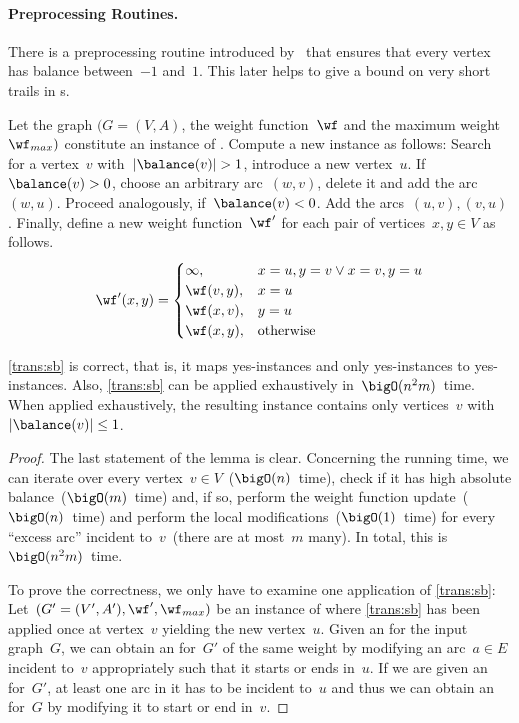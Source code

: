 \paragraph{Preprocessing Routines.}
There is a preprocessing routine introduced by~\citet{DMNW10} that ensures that every vertex has balance between~$-1$ and~$1$. This later helps to give a bound on very short trails in \EE s.
\begin{transformation}
  \label{trans:sb}
  Let the graph $(G=(V,A)$, the weight function~$\wf$ and the maximum weight~$\wf_{max})$ constitute an instance of \pWMEEs{}. Compute a new instance as follows: Search for a vertex~$v$ with~$|\balance(v)| > 1$, introduce a new vertex~$u$. If~$\balance(v) > 0$, choose an arbitrary arc~$(w, v)$, delete it and add the arc~$(w, u)$. Proceed analogously, if~$\balance(v) < 0$. Add the arcs~$(u, v), (v, u)$. Finally, define a new weight function~$\wf'$ for each pair of vertices~$x, y \in V$ as follows.
\[\wf'(x, y) = 
\begin{cases}
  \infty, & x = u, y = v \vee x = v, y = u \\
  \wf(v, y), & x = u \\
  \wf(x, v), & y = u \\
  \wf(x, y), & \text{otherwise}
\end{cases}
\]
\end{transformation}
\begin{lemma}
  \label{lem:smallbalancepp}
  \autoref{trans:sb} is correct, that is, it maps yes-instances and only yes-instances to yes-instances. Also, \autoref{trans:sb} can be applied exhaustively in~$\bigO(n^2m)$~time. When applied exhaustively, the resulting instance contains only vertices~$v$ with~$|\balance(v)| \leq 1$.
\end{lemma}
\begin{proof}
  The last statement of the lemma is clear. Concerning the running time, we can iterate over every vertex~$v \in V$~($\bigO(n)$~time), check if it has high absolute balance~($\bigO(m)$~time) and, if so, perform the weight function update~($\bigO(n)$~time) and perform the local modifications~($\bigO(1)$~time) for every ``excess arc'' incident to~$v$~(there are at most~$m$ many). In total, this is~$\bigO(n^2m)$~time.

  To prove the correctness, we only have to examine one application of \autoref{trans:sb}: Let~$(G'=(V',A'),\wf', \wf_{max})$ be an instance of \pWMEEs{} where \autoref{trans:sb} has been applied once at vertex~$v$ yielding the new vertex~$u$. Given an \EE{} for the input graph~$G$, we can obtain an \EE{} for~$G'$ of the same weight by modifying an arc~$a \in E$ incident to~$v$ appropriately such that it starts or ends in~$u$. If we are given an \EE{} for~$G'$, at least one arc in it has to be incident to~$u$ and thus we can obtain an \EE{} for~$G$ by modifying it to start or end in~$v$.
\end{proof}


